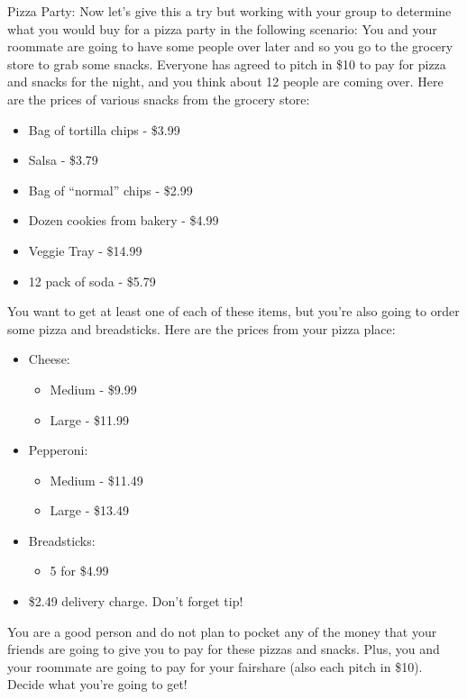 \documentclass{ximera}
\begin{document}
\begin{problem}Pizza Party: 
Now let’s give this a try but working with your group to determine what you would buy for a pizza party in the following scenario: 
You and your roommate are going to have some people over later and so you go to the grocery store to grab some snacks.  Everyone has agreed to pitch in \$10 to pay for pizza and snacks for the night, and you think about 12 people are coming over.  Here are the prices of various snacks from the grocery store: 
\begin{itemize}
    \item Bag of tortilla chips - \$3.99 
    \item Salsa - \$3.79 
    \item Bag of “normal” chips - \$2.99 
    \item Dozen cookies from bakery - \$4.99 
    \item Veggie Tray - \$14.99 
    \item 12 pack of soda - \$5.79 
\end{itemize}
You want to get at least one of each of these items, but you’re also going to order some pizza and breadsticks. 
Here are the prices from your pizza place: 
\begin{itemize}
    \item Cheese: 
    \begin{itemize}
        \item Medium - \$9.99 
        \item Large - \$11.99 
    \end{itemize}
    \item Pepperoni: 
    \begin{itemize}
        \item Medium - \$11.49 
        \item Large - \$13.49 
    \end{itemize}
    \item Breadsticks: 
    \begin{itemize}
        \item 5 for \$4.99 
    \end{itemize}
    \item \$2.49 delivery charge.  Don’t forget tip! 
\end{itemize}


You are a good person and do not plan to pocket any of the money that your friends are going to give you to pay for these pizzas and snacks.  Plus, you and your roommate are going to pay for your fairshare (also each pitch in \$10).  Decide what you’re going to get! 
\end{problem}
\end{document}
